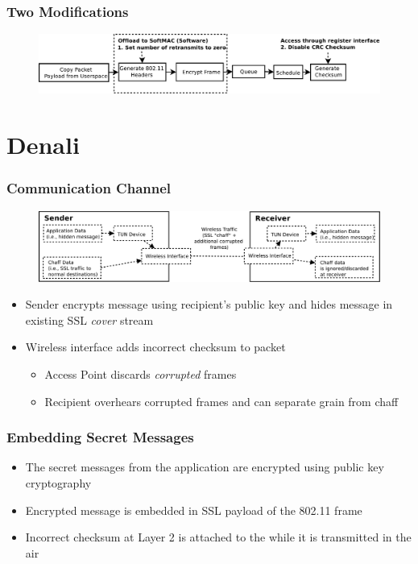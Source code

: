 \documentclass{beamer}
\begin{document}
\begin{frame}
  \frametitle{Two Modifications}
  \begin{figure}
    \centering
    \includegraphics[width=\linewidth]{images/wireless-mods}
  \end{figure}
\end{frame}

\section{Denali}
\begin{frame}
  \frametitle{ Communication Channel}
  \begin{figure}
    \centering
    \includegraphics[width=\linewidth]{images/denali-tunnel}
  \end{figure}
  \begin{itemize}
  \item  Sender encrypts message using recipient's public key and
    hides message in existing SSL \textit{cover} stream
  \item Wireless interface adds incorrect checksum to packet
    \begin{itemize}
    \item Access Point  discards \textit{corrupted} frames
    \item Recipient overhears corrupted frames and can separate grain from chaff
    \end{itemize}
  \end{itemize}
\end{frame}

\begin{frame}
  \frametitle{Embedding Secret Messages}
    \begin{itemize}
      \item The secret messages from the application  are encrypted using public key cryptography
      \item Encrypted message is embedded in SSL payload of the 802.11 frame
        \item Incorrect checksum at Layer 2 is attached to the while
          it is transmitted in the air
    \end{itemize}
\end{frame}
\end{document}
